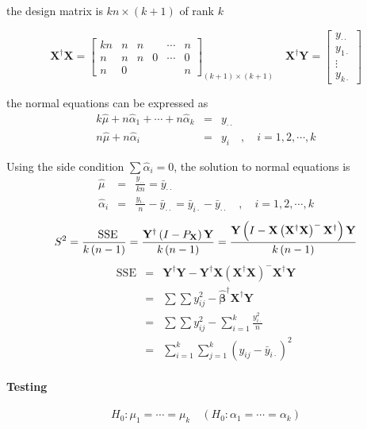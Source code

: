 \documentclass{article}
\begin{document}
the design matrix is $kn\times \left( k+1\right) $ of rank $k$

\begin{equation*}
\mathbf{X}^{\dagger }\mathbf{X}=\left[ 
\begin{array}{cccccc}
kn & n & n &  & \cdots  & n \\ 
n & n & n & 0 & \cdots  & 0 \\ 
n & 0 &  &  &  & n%
\end{array}%
\right] _{\left( k+1\right) \times \left( k+1\right) }\quad \mathbf{X}%
^{\dagger }\mathbf{Y}=\left[ 
\begin{array}{c}
y_{\cdot \cdot } \\ 
y_{1\cdot } \\ 
\vdots  \\ 
y_{k\cdot }%
\end{array}%
\right] 
\end{equation*}

\bigskip 

the normal equations can be expressed as%
\begin{eqnarray*}
k\hat{\mu}+n\hat{\alpha}_{1}+\cdots +n\hat{\alpha}_{k} &=&y_{\cdot \cdot } \\
n\hat{\mu}+n\hat{\alpha}_{i} &=&y_{i}\quad ,\quad i=1,2,\cdots ,k
\end{eqnarray*}

Using the side condition $\sum \hat{\alpha}_{i}=0$, the solution to normal
equations is%
\begin{eqnarray*}
\hat{\mu} &=&\frac{y_{\cdot \cdot }}{kn}=\bar{y}_{\cdot \cdot } \\
\hat{\alpha}_{i} &=&\frac{y_{i\cdot }}{n}-\bar{y}_{\cdot \cdot }=\bar{y}%
_{i\cdot }-\bar{y}_{\cdot \cdot }\quad ,\quad i=1,2,\cdots ,k
\end{eqnarray*}%
\begin{equation*}
S^{2}=\frac{\text{SSE}}{k\left( n-1\right) }=\frac{\mathbf{Y}^{\dagger
}\left( I-P_{\mathbf{X}}\right) \mathbf{Y}}{k\left( n-1\right) }=\frac{%
\mathbf{Y}\left( I-\mathbf{X}\left( \mathbf{X}^{\dagger }\mathbf{X}\right)
^{-}\mathbf{X}^{\dagger }\right) \mathbf{Y}}{k\left( n-1\right) }
\end{equation*}%
\begin{eqnarray*}
\text{SSE} &=&\mathbf{Y}^{\dagger }\mathbf{Y-Y}^{\dagger }\mathbf{X}\left( 
\mathbf{X}^{\dagger }\mathbf{X}\right) ^{-}\mathbf{X}^{\dagger }\mathbf{Y} \\
&=&\sum \sum y_{ij}^{2}-\mathbf{\hat{\beta}}^{\dagger }\mathbf{X}^{\dagger }%
\mathbf{Y} \\
&=&\sum \sum y_{ij}^{2}-\sum_{i=1}^{k}\frac{y_{i\cdot }^{2}}{n} \\
&=&\sum_{i=1}^{k}\sum_{j=1}^{k}\left( y_{ij}-\bar{y}_{i\cdot }\right) ^{2}
\end{eqnarray*}

\bigskip 

\paragraph{Testing}

\begin{equation*}
H_{0}:\mu _{1}=\cdots =\mu _{k}\quad \left( H_{0}:\alpha _{1}=\cdots =\alpha
_{k}\right) 
\end{equation*}
\end{document}
